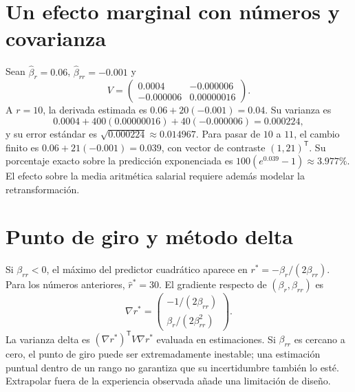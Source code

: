 \documentclass[11pt,a4paper]{article}
\newcommand{\T}{^{\mathsf T}}
\theoremstyle{definition}
\begin{document}
\section{Un efecto marginal con números y covarianza}
Sean $\widehat\beta_r=0.06$, $\widehat\beta_{rr}=-0.001$ y
\[
V=\begin{pmatrix}0.0004&-0.000006\\-0.000006&0.00000016\end{pmatrix}.
\]
A $r=10$, la derivada estimada es $0.06+20(-0.001)=0.04$.
Su varianza es
\[
0.0004+400(0.00000016)+40(-0.000006)=0.000224,
\]
y su error estándar es $\sqrt{0.000224}\approx0.014967$.
Para pasar de $10$ a $11$, el cambio finito es
$0.06+21(-0.001)=0.039$, con vector de contraste $(1,21)\T$.
Su porcentaje exacto sobre la predicción exponenciada es
$100(e^{0.039}-1)\approx3.977\%$.
El efecto sobre la media aritmética salarial requiere además modelar la retransformación.

\section{Punto de giro y método delta}
Si $\beta_{rr}<0$, el máximo del predictor cuadrático aparece en
$r^*=-\beta_r/(2\beta_{rr})$.
Para los números anteriores, $\widehat r^*=30$.
El gradiente respecto de $(\beta_r,\beta_{rr})$ es
\[
\nabla r^*=\begin{pmatrix}-1/(2\beta_{rr})\\\beta_r/(2\beta_{rr}^2)\end{pmatrix}.
\]
La varianza delta es $(\nabla r^*)\T V\nabla r^*$ evaluada en estimaciones.
Si $\beta_{rr}$ es cercano a cero, el punto de giro puede ser extremadamente inestable; una estimación puntual dentro de un rango no garantiza que su incertidumbre también lo esté.
Extrapolar fuera de la experiencia observada añade una limitación de diseño.
\end{document}
